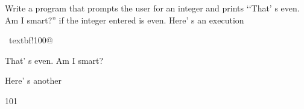Write a program that prompts the user for an integer and prints \lq\lq That' s even. Am I smart?'' if the integer entered is even. Here' s an execution

\begin{console}[commandchars=\~\!\@]

~textbf!100@



That' s even. Am I smart?

\end{console}



Here' s another

\begin{console}

101 

\end{console}

